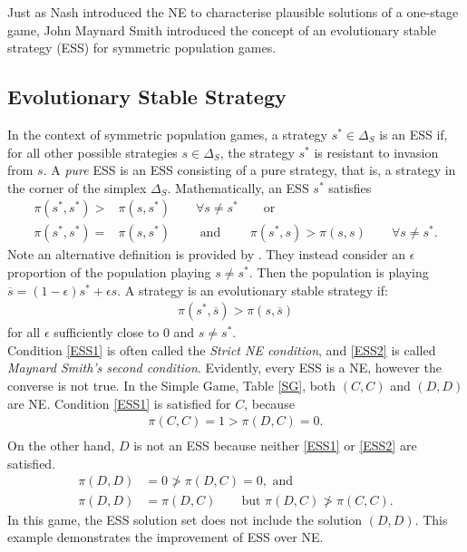 Just as Nash introduced the NE to characterise plausible solutions of a one-stage game, John Maynard Smith introduced the concept of an evolutionary stable strategy (ESS) for symmetric population games. 
\subsection{Evolutionary Stable Strategy}
In the context of symmetric population games, a strategy $s^* \in \Delta_S$ is an ESS if, for all other possible strategies $s \in \Delta_S$, the strategy $s^*$ is resistant to invasion from $s$. A \emph{pure} ESS is an ESS consisting of a pure strategy, that is, a strategy in the corner of the simplex $\Delta_S$. Mathematically, an ESS  $s^*$ satisfies  \\
\begin{align}
    \pi(s^*,s^*) >& \pi(s, s^*) \qquad \forall s \neq s^* \qquad \text{or} \label{ESS1}\\
    \pi(s^*, s^*) =& \pi(s, s^*) \qquad \text{     and      } \qquad \pi(s^*, s) > \pi(s,s) \qquad \forall s \neq s^*. \label{ESS2} 
\end{align}
Note an alternative definition is provided by \cite{RN80}. They instead consider an $\epsilon$ proportion of the population playing $s \neq s^*$. Then the population is playing $\overline{s} = (1-\epsilon)s^* + \epsilon s $. A strategy is an evolutionary stable strategy if: \\
\begin{align*}
    \pi(s^*, \overline{s}) > \pi(s, \overline{s})
\end{align*}
for all $\epsilon$ sufficiently close to 0 and $s \neq s^*$. \\

Condition \eqref{ESS1} is often called the \emph{Strict NE condition}, and \eqref{ESS2} is called \emph{Maynard Smith's second condition}. Evidently, every ESS is a NE, however the converse is not true. In the Simple Game, Table \ref{SG}, both $(C,C)$ and $(D,D)$ are NE. Condition \eqref{ESS1} is satisfied for $C$, because \\
\begin{align*}
    \pi(C,C) = 1 > \pi(D,C) = 0. \\
\end{align*}
On the other hand, $D$ is not an ESS because neither \eqref{ESS1} or \eqref{ESS2} are satisfied. \\
\begin{align*}
    \pi(D,D) &= 0 \ngtr \pi(D,C) = 0, \text{ and}\\
    \pi(D,D) &= \pi(D,C) \qquad \text{but } \pi(D,C) \ngtr \pi(C,C).
\end{align*}
In this game, the ESS solution set does not include the  solution $(D,D)$. This example demonstrates the improvement of ESS over NE. \\


